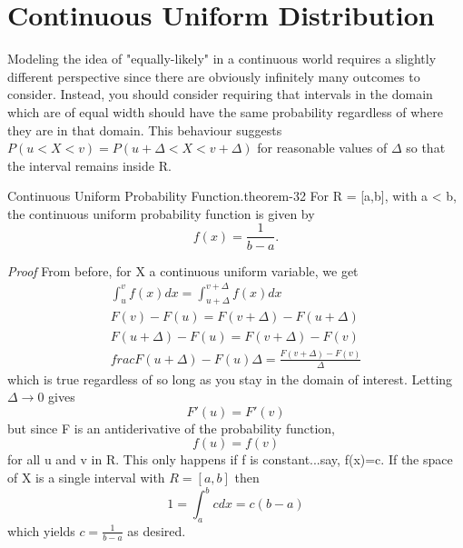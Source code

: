 \documentclass[10pt,]{book}
\makeatletter
\renewcommand*{\proofname}{Proof}
\renewenvironment{proof}[1][\proofname]{\par
  \pushQED{\qed}%
  \normalfont \topsep6\p@\@plus6\p@\relax
  \trivlist
  \item\relax
    {\itshape
    #1\@addpunct{.}}\hspace\labelsep\ignorespaces
}{%
  \popQED\endtrivlist\@endpefalse
}
\numberwithin{equation}{section}
\newcommand{\lt}{<}
\makeatother
\begin{document}
\section[{Continuous Uniform Distribution}]{Continuous Uniform Distribution}\label{section-41}
\hypertarget{p-805}{}%
Modeling the idea of "equally-likely" in a continuous world requires a slightly different perspective since there are obviously infinitely many outcomes to consider. Instead, you should consider requiring that intervals in the domain which are of equal width should have the same probability regardless of where they are in that domain. This behaviour suggests \(P(u \lt X \lt v) = P(u + \Delta \lt X \lt v + \Delta)\) for reasonable values of \(\Delta\) so that the interval remains inside R.%
\par
\hypertarget{p-806}{}%
\begin{theorem}{Continuous Uniform Probability Function.}{}{theorem-32}%
\hypertarget{ContinuousUniformFunction}{}%
For R = [a,b], with a < b, the continuous uniform probability function is given by%
\begin{equation*}
f(x) = \frac{1}{b-a}.
\end{equation*}
%
\end{theorem}
\begin{proof}\hypertarget{proof-35}{}
\hypertarget{p-808}{}%
From before, for X a continuous uniform variable, we get%
\begin{gather*}
\int_u^v f(x) dx = \int_{u+\Delta}^{v+\Delta} f(x) dx\\
F(v)-F(u) = F(v+\Delta)-F(u+\Delta)\\
F(u+\Delta)-F(u) = F(v+\Delta)-F(v)\\
frac{F(u+\Delta)-F(u)}{\Delta} = \frac{F(v+\Delta)-F(v)}{\Delta}
\end{gather*}
which is true regardless of \Delta so long as you stay in the domain of interest. Letting \(\Delta \rightarrow 0\) gives%
\begin{equation*}
F'(u) = F'(v)
\end{equation*}
but since F is an antiderivative of the probability function,%
\begin{equation*}
f(u) = f(v)
\end{equation*}
for all u and v in R. This only happens if f is constant...say, f(x)=c. If the space of X is a single interval with \(R = [a,b]\) then%
\begin{equation*}
1 = \int_a^b c dx = c(b-a)
\end{equation*}
which yields \(c = \frac{1}{b-a}\) as desired.%
\end{proof}
\end{document}

